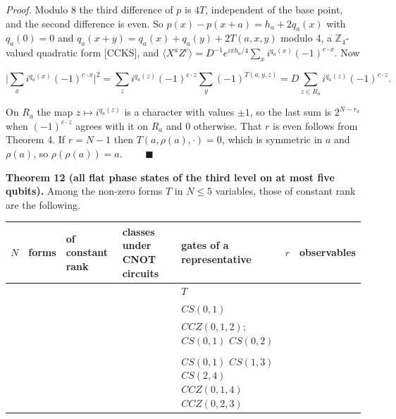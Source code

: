 \documentclass[11pt,a4paper]{article}
\begin{document}
\emph{Proof.} Modulo 8 the third difference of \(p\) is \(4T\), independent of the base point, and the second
difference is even. So \(p(x) - p(x+a) = h_a + 2q_a(x)\) with \(q_a(0) = 0\) and
\(q_a(x+y) = q_a(x) + q_a(y) + 2T(a,x,y)\) modulo 4, a \(\mathbb{Z}_4\)-valued quadratic form {[}CCKS{]}, and
\(\langle X^aZ^c\rangle = D^{-1}e^{i\pi h_a/4}\sum_x i^{q_a(x)}(-1)^{c\cdot x}\). Now

\[\Big|\sum_x i^{q_a(x)}(-1)^{c\cdot x}\Big|^2 = \sum_z i^{q_a(z)}(-1)^{c\cdot z}\sum_y (-1)^{T(a,y,z)}
 = D \sum_{z \in R_a} i^{q_a(z)}(-1)^{c\cdot z} .\]

On \(R_a\) the map \(z \mapsto i^{q_a(z)}\) is a character with values \(\pm1\), so the last sum is
\(2^{N-r_a}\) when \((-1)^{c\cdot z}\) agrees with it on \(R_a\) and \(0\) otherwise. That \(r\) is even follows
from Theorem 4. If \(r = N-1\) then \(T(a,\rho(a),\cdot) = 0\), which is symmetric in \(a\) and \(\rho(a)\), so
\(\rho(\rho(a)) = a\). \(\qquad\blacksquare\)

\textbf{Theorem 12 (all flat phase states of the third level on at most five qubits).} Among the non-zero
forms \(T\) in \(N \le 5\) variables, those of constant rank are the following.

{\def\LTcaptype{none} %
{\footnotesize
\begin{longtable}[]{@{}>{\raggedright\arraybackslash}p{}>{\raggedright\arraybackslash}p{}>{\raggedright\arraybackslash}p{}>{\raggedright\arraybackslash}p{}>{\raggedright\arraybackslash}p{}>{\raggedright\arraybackslash}p{}>{\raggedright\arraybackslash}p{}@{}}
\toprule\noalign{}
\(N\) & forms & of constant rank & classes under CNOT circuits & gates of a representative & \(r\) & observables \\
\midrule\noalign{}
\endhead
\bottomrule\noalign{}
\endlastfoot
1 & 1 & 1 & 1 & \(T\) & 1 & 2 \\
2 & 7 & 1 & 1 & \(CS(0,1)\) & 2 & 12 \\
3 & 127 & 8 & 2 & \(CCZ(0,1,2)\); \(CS(0,1)\) \(CS(0,2)\) & 2 & 28 \\
4 & 16383 & 0 & & & & \\
5 & 33554431 & 166656 & 1 & \(CS(0,1)\) \(CS(1,3)\) \(CS(2,4)\) \(CCZ(0,1,4)\) \(CCZ(0,2,3)\) & 4 & 496 \\
\end{longtable}
}
}
\end{document}
